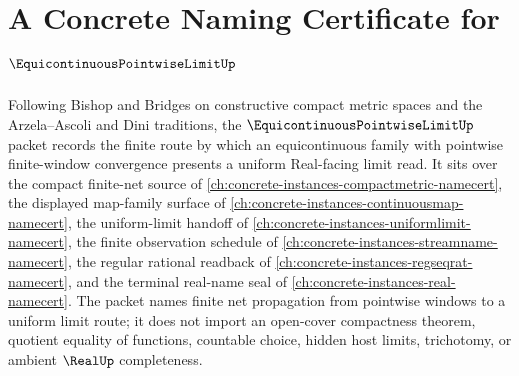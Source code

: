 \chapter{A Concrete Naming Certificate for $\EquicontinuousPointwiseLimitUp$}
\label{ch:concrete-instances-equicontinuous-pointwise-limit-namecert}

Following Bishop and Bridges on constructive compact metric spaces and the Arzela--Ascoli and Dini traditions, the $\EquicontinuousPointwiseLimitUp$ packet records the finite route by which an equicontinuous family with pointwise finite-window convergence presents a uniform Real-facing limit read. It sits over the compact finite-net source of \autoref{ch:concrete-instances-compactmetric-namecert}, the displayed map-family surface of \autoref{ch:concrete-instances-continuousmap-namecert}, the uniform-limit handoff of \autoref{ch:concrete-instances-uniformlimit-namecert}, the finite observation schedule of \autoref{ch:concrete-instances-streamname-namecert}, the regular rational readback of \autoref{ch:concrete-instances-regseqrat-namecert}, and the terminal real-name seal of \autoref{ch:concrete-instances-real-namecert}. The packet names finite net propagation from pointwise windows to a uniform limit route; it does not import an open-cover compactness theorem, quotient equality of functions, countable choice, hidden host limits, trichotomy, or ambient $\RealUp$ completeness.

